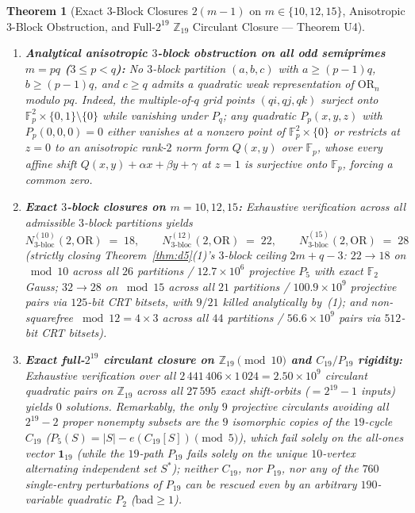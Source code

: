\documentclass[11pt,a4paper]{article}
\newtheorem{theorem}{Theorem}[section]
\theoremstyle{definition}
\newcommand{\F}{\mathbb{F}}
\newcommand{\Z}{\mathbb{Z}}
\newcommand{\OR}{\mathrm{OR}}
\begin{document}
\begin{theorem}[Exact $3$-Block Closures $2(m - 1)$ on $m \in \{10, 12, 15\}$, Anisotropic $3$-Block Obstruction, and Full-$2^{19}$ $\Z_{19}$ Circulant Closure --- Theorem U4]
\label{thm:u4}
\begin{enumerate}[leftmargin=*,nosep]
  \item \textbf{Analytical anisotropic $3$-block obstruction on all odd semiprimes $m = pq$ ($3 \le p < q$):} No $3$-block partition $(a, b, c)$ with $a \ge (p - 1)q$, $b \ge (p - 1)q$, and $c \ge q$ admits a quadratic weak representation of $\OR_n$ modulo $pq$. Indeed, the multiple-of-$q$ grid points $(qi, qj, qk)$ surject onto $\F_p^2 \times \{0, 1\} \setminus \{0\}$ while vanishing under $P_q$; any quadratic $P_p(x, y, z)$ with $P_p(0, 0, 0) = 0$ either vanishes at a nonzero point of $\F_p^2 \times \{0\}$ or restricts at $z = 0$ to an anisotropic rank-$2$ norm form $Q(x, y)$ over $\F_p$, whose every affine shift $Q(x, y) + \alpha x + \beta y + \gamma$ at $z = 1$ is surjective onto $\F_p$, forcing a common zero.
  \item \textbf{Exact $3$-block closures on $m = 10, 12, 15$:} Exhaustive verification across all admissible $3$-block partitions yields
  \[
    N_{3\text{-bloc}}^{(10)}(2, \OR) \;=\; 18, \qquad
    N_{3\text{-bloc}}^{(12)}(2, \OR) \;=\; 22, \qquad
    N_{3\text{-bloc}}^{(15)}(2, \OR) \;=\; 28
  \]
  (strictly closing Theorem~\ref{thm:d5}(1)'s $3$-block ceiling $2m + q - 3$: $22 \to 18$ on $\bmod 10$ across all $26$ partitions / $12.7 \times 10^6$ projective $P_5$ with exact $\F_2$ Gauss; $32 \to 28$ on $\bmod 15$ across all $21$ partitions / $100.9 \times 10^9$ projective pairs via $125$-bit CRT bitsets, with $9/21$ killed analytically by~(1); and non-squarefree $\bmod 12 = 4 \times 3$ across all $44$ partitions / $56.6 \times 10^9$ pairs via $512$-bit CRT bitsets).
  \item \textbf{Exact full-$2^{19}$ circulant closure on $\Z_{19} \pmod{10}$ and $C_{19}/P_{19}$ rigidity:} Exhaustive verification over all $2\,441\,406 \times 1\,024 = 2.50 \times 10^9$ circulant quadratic pairs on $\Z_{19}$ across all $27\,595$ exact shift-orbits ($= 2^{19} - 1$ inputs) yields $0$ solutions. Remarkably, the only $9$ projective circulants avoiding all $2^{19} - 2$ proper nonempty subsets are the $9$ isomorphic copies of the $19$-cycle $C_{19}$ ($P_5(S) = |S| - e(C_{19}[S]) \pmod 5$), which fail solely on the all-ones vector $\mathbf{1}_{19}$ (while the $19$-path $P_{19}$ fails solely on the unique $10$-vertex alternating independent set $S^*$); neither $C_{19}$, nor $P_{19}$, nor any of the $760$ single-entry perturbations of $P_{19}$ can be rescued even by an arbitrary $190$-variable quadratic $P_2$ ($\mathrm{bad} \ge 1$).
\end{enumerate}
\end{theorem}
\end{document}
